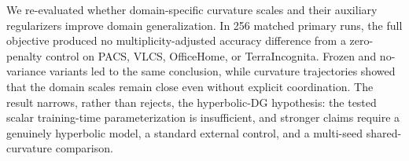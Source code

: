 \documentclass[10pt]{article}
\begin{document}
We re-evaluated whether domain-specific curvature scales and their auxiliary
regularizers improve domain generalization. In 256 matched primary runs, the
full objective produced no multiplicity-adjusted accuracy difference from a
zero-penalty control on PACS, VLCS, OfficeHome, or TerraIncognita. Frozen and
no-variance variants led to the same conclusion, while curvature trajectories
showed that the domain scales remain close even without explicit coordination.
The result narrows, rather than rejects, the hyperbolic-DG hypothesis: the
tested scalar training-time parameterization is insufficient, and stronger
claims require a genuinely hyperbolic model, a standard external control, and a
multi-seed shared-curvature comparison.



\end{document}
